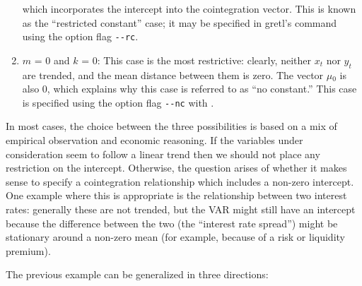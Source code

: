 \begin{enumerate}
	  which incorporates the intercept into the cointegration
	  vector. This is known as the ``restricted constant'' case;
	  it may be specified in gretl's  command using
	  the option flag \verb+--rc+.
	
\item 
	  $m$ = 0 and $k$ = 0: This case
	  is the most restrictive: clearly, neither $x_t$ nor $y_t$ are trended,
	  and the mean distance between them is zero. The vector
	  $\mu$\ensuremath{_{0}} is also 0, which explains why this case
	  is referred to as ``no constant.''  This case is specified
	  using the option flag \verb+--nc+ with
	  .
	
\end{enumerate}


      In most cases, the choice between the three possibilities is based on a
      mix of empirical observation and economic reasoning. If the variables
      under consideration seem to follow a linear trend then we should not
      place any restriction on the intercept. Otherwise, the question arises of
      whether it makes sense to specify a cointegration relationship which
      includes a non-zero intercept. One example where this is appropriate is the
      relationship between two interest rates: generally these are not trended,
      but the VAR might still have an intercept because the difference between
      the two (the ``interest rate spread'') might be stationary
      around a non-zero mean (for example, because of a risk or liquidity
      premium).
    
      The previous example can be generalized in three directions:
    
